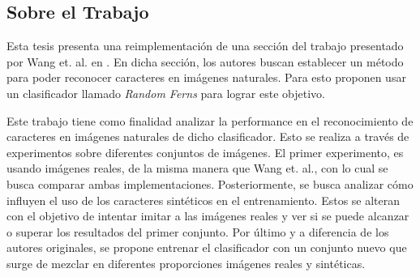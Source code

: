\subsection{Sobre el Trabajo}

	Esta tesis presenta una reimplementación de una sección del trabajo presentado por Wang et. al. en \cite{wang}. En dicha sección, los autores buscan establecer un método para poder reconocer caracteres en imágenes naturales. Para esto proponen usar un clasificador llamado \textit{Random Ferns} para lograr este objetivo.
	
	Este trabajo tiene como finalidad analizar la performance en el reconocimiento de caracteres en imágenes naturales de dicho clasificador. Esto se realiza a través de experimentos sobre diferentes conjuntos de imágenes. El primer experimento, es usando imágenes reales, de la misma manera que Wang et. al., con lo cual se busca comparar ambas implementaciones. Posteriormente, se busca analizar cómo influyen el uso de los caracteres sintéticos en el entrenamiento. Estos se alteran con el objetivo de intentar imitar a las imágenes reales y ver si se puede alcanzar o superar los resultados del primer conjunto. Por último y a diferencia de los autores originales, se propone entrenar el clasificador con  un conjunto nuevo que surge de mezclar en diferentes proporciones imágenes reales y sintéticas.